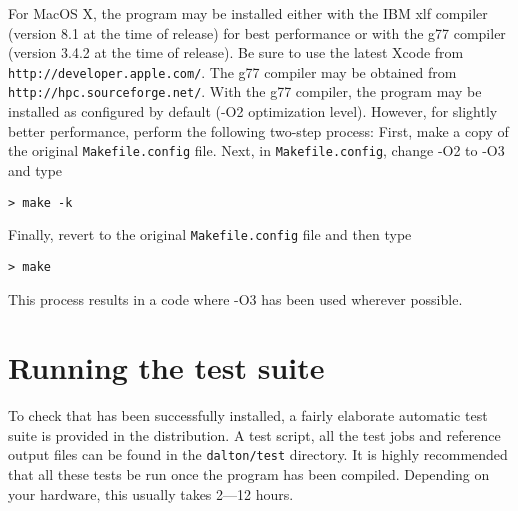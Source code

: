 For MacOS X, the program may be installed either with the IBM
xlf compiler (version 8.1 at the time of release) for best  performance 
or with the g77 compiler (version 3.4.2 at the time of release). Be sure
to use the latest Xcode from \verb|http://developer.apple.com/|. The
g77 compiler may be obtained from \verb|http://hpc.sourceforge.net/|.  With
the g77 compiler, the program may be installed as configured by default
(-O2 optimization level). However, for slightly better performance,
perform the following two-step process: First, make a copy of the original
\verb|Makefile.config| file. Next, in \verb|Makefile.config|, 
change -O2 to -O3 and type
\begin{verbatim}
> make -k
\end{verbatim}
Finally, revert to the original \verb|Makefile.config| file and then type
\begin{verbatim} 
> make 
\end{verbatim} 
This process results in a code where -O3 has been used wherever possible.

%

\section{Running the {\dalton} test suite}\label{sec:testsuite}

To check that {\dalton} has been successfully installed, a fairly
elaborate automatic test suite is provided in the distribution. A test
script, all the test jobs and reference output files can be found in
the \verb|dalton/test| directory. It is highly recommended that all
these tests be run once the program has been compiled. Depending on
your hardware, this usually takes 2---12 hours.

